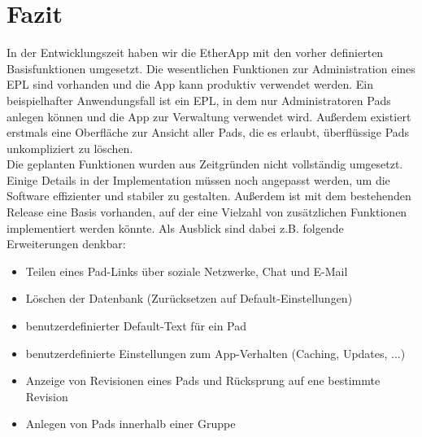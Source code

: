 \section{Fazit}
In der Entwicklungszeit haben wir die EtherApp mit den vorher definierten Basisfunktionen umgesetzt.
Die wesentlichen Funktionen zur Administration eines EPL sind vorhanden und die App kann produktiv verwendet werden.
Ein beispielhafter Anwendungsfall ist ein EPL, in dem nur Administratoren Pads anlegen können und die App zur Verwaltung verwendet wird.
Außerdem existiert erstmals eine Oberfläche zur Ansicht aller Pads, die es erlaubt, überflüssige Pads unkompliziert zu löschen.\\
Die geplanten Funktionen wurden aus Zeitgründen nicht vollständig umgesetzt.
Einige Details in der Implementation müssen noch angepasst werden, um die Software effizienter und stabiler zu gestalten.
Außerdem ist mit dem bestehenden Release eine Basis vorhanden, auf der eine Vielzahl von zusätzlichen Funktionen implementiert werden könnte.
Als Ausblick sind dabei z.B. folgende Erweiterungen denkbar:
\begin{itemize}
	\item Teilen eines Pad-Links über soziale Netzwerke, Chat und E-Mail
	\item Löschen der Datenbank (Zurücksetzen auf Default-Einstellungen)
	\item benutzerdefinierter Default-Text für ein Pad
	\item benutzerdefinierte Einstellungen zum App-Verhalten (Caching, Updates, ...)
	\item Anzeige von Revisionen eines Pads und Rücksprung auf ene bestimmte Revision
	\item Anlegen von Pads innerhalb einer Gruppe
\end{itemize}


	